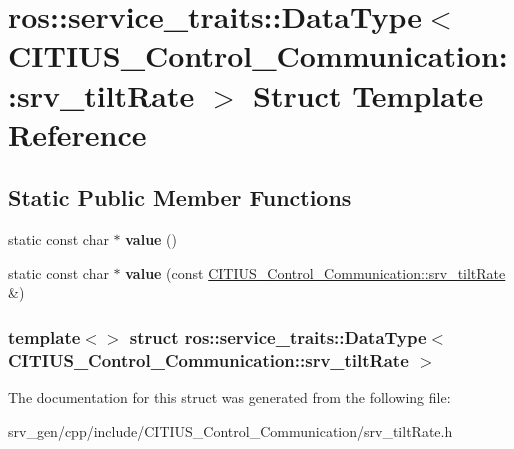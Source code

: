 \hypertarget{structros_1_1service__traits_1_1_data_type_3_01_c_i_t_i_u_s___control___communication_1_1srv__tilt_rate_01_4}{\section{ros\-:\-:service\-\_\-traits\-:\-:\-Data\-Type$<$ \-C\-I\-T\-I\-U\-S\-\_\-\-Control\-\_\-\-Communication\-:\-:srv\-\_\-tilt\-Rate $>$ \-Struct \-Template \-Reference}
\label{structros_1_1service__traits_1_1_data_type_3_01_c_i_t_i_u_s___control___communication_1_1srv__tilt_rate_01_4}
}
\subsection*{\-Static \-Public \-Member \-Functions}
\begin{DoxyCompactItemize}
\item 
\hypertarget{structros_1_1service__traits_1_1_data_type_3_01_c_i_t_i_u_s___control___communication_1_1srv__tilt_rate_01_4_a13cad36e0022d681f730cd26f3b73ab7}{static const char $\ast$ {\bfseries value} ()}\label{structros_1_1service__traits_1_1_data_type_3_01_c_i_t_i_u_s___control___communication_1_1srv__tilt_rate_01_4_a13cad36e0022d681f730cd26f3b73ab7}

\item 
\hypertarget{structros_1_1service__traits_1_1_data_type_3_01_c_i_t_i_u_s___control___communication_1_1srv__tilt_rate_01_4_adcba70db5c17fb236d41ab2c99466411}{static const char $\ast$ {\bfseries value} (const \hyperlink{struct_c_i_t_i_u_s___control___communication_1_1srv__tilt_rate}{\-C\-I\-T\-I\-U\-S\-\_\-\-Control\-\_\-\-Communication\-::srv\-\_\-tilt\-Rate} \&)}\label{structros_1_1service__traits_1_1_data_type_3_01_c_i_t_i_u_s___control___communication_1_1srv__tilt_rate_01_4_adcba70db5c17fb236d41ab2c99466411}

\end{DoxyCompactItemize}
\subsubsection*{template$<$$>$ struct ros\-::service\-\_\-traits\-::\-Data\-Type$<$ C\-I\-T\-I\-U\-S\-\_\-\-Control\-\_\-\-Communication\-::srv\-\_\-tilt\-Rate $>$}



\-The documentation for this struct was generated from the following file\-:\begin{DoxyCompactItemize}
\item 
srv\-\_\-gen/cpp/include/\-C\-I\-T\-I\-U\-S\-\_\-\-Control\-\_\-\-Communication/srv\-\_\-tilt\-Rate.\-h\end{DoxyCompactItemize}
